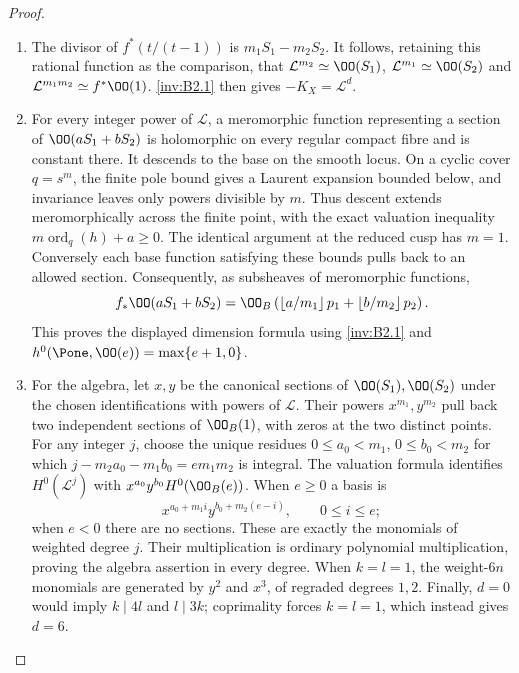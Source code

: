 \begin{proof}
\begin{enumerate}[label=\arabic*.,leftmargin=*]
\item The divisor of $f^*(t/(t-1))$ is $m_1S_1-m_2S_2$.
It follows, retaining this rational function as the comparison, that
$\mathcal L^{m_2}\simeq\OO(S_1)$,
$\mathcal L^{m_1}\simeq\OO(S_2)$ and
$\mathcal L^{m_1m_2}\simeq f^*\OO(1)$.
\ref{inv:B2.1} then gives $-K_X=\mathcal L^d$.

\item For every integer
power of $\mathcal L$, a meromorphic function representing a section
of $\OO(aS_1+bS_2)$ is holomorphic on every regular compact fibre
and is constant there. It descends to the base on the smooth locus.
On a cyclic cover $q=s^m$, the finite pole bound gives a Laurent
expansion bounded below, and invariance leaves only powers divisible
by $m$. Thus descent extends meromorphically across the finite point,
with the exact valuation inequality $m\operatorname{ord}_q(h)+a\ge0$.
The identical argument at the reduced cusp has $m=1$.
Conversely each base function satisfying these bounds pulls back to
an allowed section. Consequently, as subsheaves of meromorphic functions,
\[
f_*\OO(aS_1+bS_2)=
\OO_B\left(\left\lfloor a/m_1\right\rfloor p_1+
\left\lfloor b/m_2\right\rfloor p_2\right).
\]
This proves the displayed dimension formula using \ref{inv:B2.1} and
$h^0(\Pone,\OO(e))=\max\{e+1,0\}$.

\item For the algebra, let $x,y$ be the canonical sections of
$\OO(S_1),\OO(S_2)$ under the chosen identifications with powers of
$\mathcal L$. Their powers $x^{m_1},y^{m_2}$ pull back two independent
sections of $\OO_B(1)$, with zeros at the two distinct points.
For any integer $j$, choose the unique residues
$0\le a_0<m_1$, $0\le b_0<m_2$ for which
$j-m_2a_0-m_1b_0=e m_1m_2$ is integral.
The valuation formula identifies $H^0(\mathcal L^j)$ with
$x^{a_0}y^{b_0}H^0(\OO_B(e))$. When $e\ge0$ a basis is
\[
x^{a_0+m_1i}y^{b_0+m_2(e-i)},\qquad0\le i\le e;
\]
when $e<0$ there are no sections. These are exactly the monomials of
weighted degree $j$. Their multiplication is ordinary polynomial
multiplication, proving the algebra assertion in every degree.
When $k=l=1$, the weight-$6n$ monomials are generated by $y^2$ and
$x^3$, of regraded degrees $1,2$.
Finally, $d=0$ would imply $k\mid4l$ and $l\mid3k$; coprimality
forces $k=l=1$, which instead gives $d=6$.
\end{enumerate}
\end{proof}
